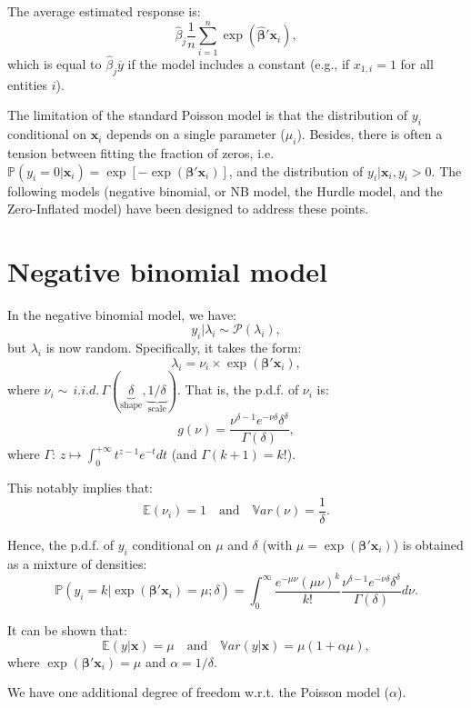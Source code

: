 \documentclass[
  12pt,
]{book}
\theoremstyle{definition}
\theoremstyle{definition}
\theoremstyle{definition}
\theoremstyle{definition}
\theoremstyle{remark}
\begin{document}
The average estimated response is:
\[
\widehat{\beta}_j \frac{1}{n}\sum_{i=1}^n  \exp(\widehat{\boldsymbol\beta}'\mathbf{x}_i),
\]
which is equal to \(\widehat{\beta}_j \overline{y}\) if the model includes a constant (e.g., if \(x_{1,i}=1\) for all entities \(i\)).

The limitation of the standard Poisson model is that the distribution of \(y_i\) conditional on \(\mathbf{x}_i\) depends on a single parameter (\(\mu_i\)). Besides, there is often a tension between fitting the fraction of zeros, i.e.~\(\mathbb{P}(y_i=0|\mathbf{x}_i)=\exp[-\exp(\boldsymbol\beta'\mathbf{x}_i)]\), and the distribution of \(y_i|\mathbf{x}_i,y_i>0\). The following models (negative binomial, or NB model, the Hurdle model, and the Zero-Inflated model) have been designed to address these points.

\hypertarget{negative-binomial-model}{%
\section{Negative binomial model}\label{negative-binomial-model}}

In the negative binomial model, we have:
\[
y_i|\lambda_i \sim \mathcal{P}(\lambda_i),
\]
but \(\lambda_i\) is now random. Specifically, it takes the form:
\[
\lambda_i = \nu_i \times \exp(\boldsymbol\beta'\mathbf{x}_i),
\]
where \(\nu_i \sim \,i.i.d.\,\Gamma(\underbrace{\delta}_{\mbox{shape}},\underbrace{1/\delta}_{\mbox{scale}})\). That is, the p.d.f. of \(\nu_i\) is:
\[
g(\nu) = \frac{\nu^{\delta - 1}e^{-\nu\delta}\delta^\delta}{\Gamma(\delta)},
\]
where \(\Gamma:\,z \mapsto \int_0^{+\infty}t^{z-1}e^{-t}dt\) (and \(\Gamma(k+1)=k!\)).

This notably implies that:
\[
\mathbb{E}(\nu_i) = 1 \quad \mbox{and} \quad \mathbb{V}ar(\nu) = \frac{1}{\delta}.
\]

Hence, the p.d.f. of \(y_i\) conditional on \(\mu\) and \(\delta\) (with \(\mu=\exp(\boldsymbol\beta'\mathbf{x}_i)\)) is obtained as a mixture of densities:
\[
\mathbb{P}(y_i=k|\exp(\boldsymbol\beta'\mathbf{x}_i)=\mu;\delta)=\int_0^\infty \frac{e^{-\mu \nu}(\mu \nu)^k}{k!} \frac{\nu^{\delta - 1}e^{-\nu\delta}\delta^\delta}{\Gamma(\delta)} d \nu.
\]

It can be shown that:
\[
\mathbb{E}(y|\mathbf{x}) = \mu \quad \mbox{and}\quad \mathbb{V}ar(y|\mathbf{x}) = \mu\left(1+\alpha \mu\right),
\]
where \(\exp(\boldsymbol\beta'\mathbf{x}_i)=\mu\) and \(\alpha = 1/\delta\).

We have one additional degree of freedom w.r.t. the Poisson model (\(\alpha\)).
\end{document}
